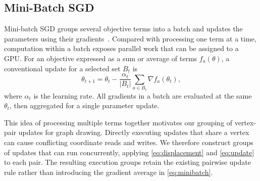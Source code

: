 \subsection{Mini-Batch SGD}
Mini-batch SGD groups several objective terms into a batch and updates the parameters using their gradients~\cite{ref4}.
Compared with processing one term at a time, computation within a batch exposes parallel work that can be assigned to a GPU.
For an objective expressed as a sum or average of terms $f_a(\theta)$, a conventional update for a selected set $B_t$ is
\begin{equation}
\theta_{t+1}=\theta_t-\frac{\alpha_t}{|B_t|}\sum_{a\in B_t}\nabla f_a(\theta_t),
\label{eq:minibatch}
\end{equation}
where $\alpha_t$ is the learning rate.
All gradients in a batch are evaluated at the same $\theta_t$, then aggregated for a single parameter update.

This idea of processing multiple terms together motivates our grouping of vertex-pair updates for graph drawing.
Directly executing updates that share a vertex can cause conflicting coordinate reads and writes.
We therefore construct groups of updates that can run concurrently, applying \eqref{eq:displacement} and \eqref{eq:update} to each pair.
The resulting execution groups retain the existing pairwise update rule rather than introducing the gradient average in \eqref{eq:minibatch}.

